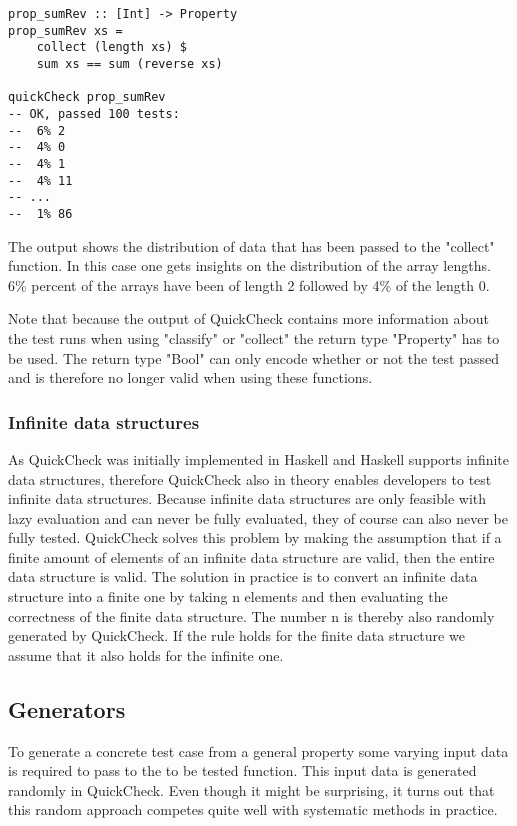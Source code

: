 \documentclass[a4paper, 12pt]{article} %
\begin{document}
\begin{verbatim}
prop_sumRev :: [Int] -> Property
prop_sumRev xs = 
    collect (length xs) $
    sum xs == sum (reverse xs)

quickCheck prop_sumRev
-- OK, passed 100 tests:
--  6% 2 
--  4% 0 
--  4% 1 
--  4% 11 
-- ... 
--  1% 86 
\end{verbatim}

The output shows the distribution of data that has been passed to the "collect" function. In this case one gets insights on the distribution of the array lengths. 6\% percent of the arrays have been of length 2 followed by 4\% of the length 0.

Note that because the output of QuickCheck contains more information about the test runs when using "classify" or "collect" the return type "Property" has to be used. The return type "Bool" can only encode whether or not the test passed and is therefore no longer valid when using these functions. 

\subsubsection{Infinite data structures}

As QuickCheck was initially implemented in Haskell and Haskell supports infinite data structures, therefore QuickCheck also in theory enables developers to test infinite data structures. Because infinite data structures are only feasible with lazy evaluation and can never be fully evaluated, they of course can also never be fully tested. QuickCheck solves this problem by making the assumption that if a finite amount of elements of an infinite data structure are valid, then the entire data structure is valid. The solution in practice is to convert an infinite data structure into a finite one by taking n elements and then evaluating the correctness of the finite data structure. The number n is thereby also randomly generated by QuickCheck. If the rule holds for the finite data structure we assume that it also holds for the infinite one. \cite{Claessen2000}

\subsection{Generators}

To generate a concrete test case from a general property some varying input data is required to pass to the to be tested function. This input data is generated randomly in QuickCheck. Even though it might be surprising, it turns out that this random approach competes quite well with systematic methods in practice. \cite{Claessen2000}
\end{document}
